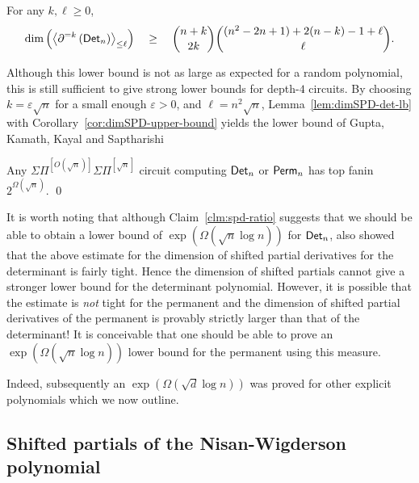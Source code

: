 \documentclass[12pt]{report}
\newcommand{\SPD}[3]{\inangle{\partial^{=#1}\inparen{#3}}_{\leq #2}}
\newcommand{\mySPSP}[2]{\Sigma\Pi^{[#1]}\Sigma\Pi^{[#2]}}
\renewcommand{\epsilon}{\varepsilon}
\begin{document}
\begin{lemma}\label{lem:dimSPD-det-lb}
For any $k,\ell \geq 0$, 
$$
\dim\inparen{\SPD{k}{\ell}{\Det_n}} \spaced{\geq} \binom{n+k}{2k}\binom{(n^2 - 2n + 1) + 2(n-k) -1 + \ell}{\ell}.
$$
\end{lemma}

Although this lower bound is not as large as expected for a random polynomial, this is still sufficient to give strong lower bounds for depth-$4$ circuits. By choosing $k = \epsilon \sqrt{n}$ for a small enough $\epsilon > 0$, and $\ell = n^2 \sqrt{n}$, Lemma~\ref{lem:dimSPD-det-lb} with Corollary~\ref{cor:dimSPD-upper-bound} yields the lower bound of Gupta, Kamath, Kayal and Saptharishi \cite{gkks13}

\begin{theorem}
Any $\mySPSP{O(\sqrt{n})}{\sqrt{n}}$ circuit computing $\mathsf{Det}_n$ or $\mathsf{Perm}_n$ has top fanin $2^{\Omega(\sqrt{n})}$. \qed
\end{theorem}

It is worth noting that although Claim~\ref{clm:spd-ratio} suggests that we should be able to obtain a lower bound of $\exp(\Omega(\sqrt{n}\log n))$ for $\mathsf{Det}_n$, \cite{gkks13} also showed that the above estimate for the dimension of shifted partial derivatives for the determinant is fairly tight. Hence the dimension of shifted partials cannot give a stronger lower bound for the determinant polynomial. However, it is possible that the estimate is \emph{not} tight for the permanent and the dimension of shifted partial derivatives of the permanent is provably strictly larger than that of the determinant! It is conceivable that one should be able to prove an $\exp(\Omega(\sqrt{n}\log n))$ lower bound for the permanent using this measure. 

Indeed, subsequently an $\exp(\Omega(\sqrt{d}\log n))$ was proved \cite{KSS13,FLMS13} for other explicit polynomials  which we now outline. 

\subsection{Shifted partials of the Nisan-Wigderson polynomial}
\end{document}
